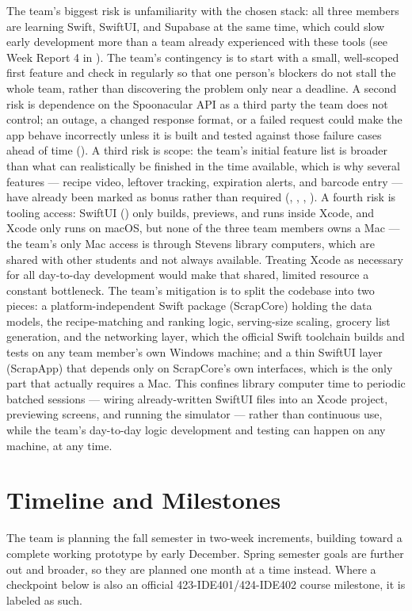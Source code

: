 The team's biggest risk is unfamiliarity with the chosen stack: all three members are learning Swift, SwiftUI, and Supabase at the same time, which could slow early development more than a team already experienced with these tools (see Week Report 4 in ). The team's contingency is to start with a small, well-scoped first feature and check in regularly so that one person's blockers do not stall the whole team, rather than discovering the problem only near a deadline. A second risk is dependence on the Spoonacular API as a third party the team does not control; an outage, a changed response format, or a failed request could make the app behave incorrectly unless it is built and tested against those failure cases ahead of time (). A third risk is scope: the team's initial feature list is broader than what can realistically be finished in the time available, which is why several features --- recipe video, leftover tracking, expiration alerts, and barcode entry --- have already been marked as bonus rather than required (, , , ). A fourth risk is tooling access: SwiftUI () only builds, previews, and runs inside Xcode, and Xcode only runs on macOS, but none of the three team members owns a Mac --- the team's only Mac access is through Stevens library computers, which are shared with other students and not always available. Treating Xcode as necessary for all day-to-day development would make that shared, limited resource a constant bottleneck. The team's mitigation is to split the codebase into two pieces: a platform-independent Swift package (ScrapCore) holding the data models, the recipe-matching and ranking logic, serving-size scaling, grocery list generation, and the networking layer, which the official Swift toolchain builds and tests on any team member's own Windows machine; and a thin SwiftUI layer (ScrapApp) that depends only on ScrapCore's own interfaces, which is the only part that actually requires a Mac. This confines library computer time to periodic batched sessions --- wiring already-written SwiftUI files into an Xcode project, previewing screens, and running the simulator --- rather than continuous use, while the team's day-to-day logic development and testing can happen on any machine, at any time.

\section{Timeline and Milestones}
The team is planning the fall semester in two-week increments, building toward a complete working prototype by early December. Spring semester goals are further out and broader, so they are planned one month at a time instead. Where a checkpoint below is also an official 423-IDE401/424-IDE402 course milestone, it is labeled as such.

